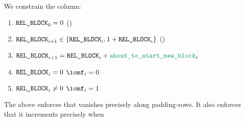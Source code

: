 We constrain the \relBlock{} column:
\begin{enumerate}
	\item $\texttt{REL\_BLOCK} _{0} = 0$ (\sanityCheck)
	\item $\texttt{REL\_BLOCK} _{i + 1} \in \{ \texttt{REL\_BLOCK}_{i}, 1 + \texttt{REL\_BLOCK}_{i} \}$ \quad (\sanityCheck)
	\item $\relBlock _{i + 1} = \relBlock _{i} + \locAboutToStartNewBlock _{i}$
	\item \If $\texttt{REL\_BLOCK} _{i} =    0$ \Then $\iomf _{i} = 0$
	\item \If $\texttt{REL\_BLOCK} _{i} \neq 0$ \Then $\iomf _{i} = 1$
\end{enumerate}
\saNote{}
The above enforces that \relBlock{} vanishes precisely along padding-rows.
It also enforces that it increments precisely when 
